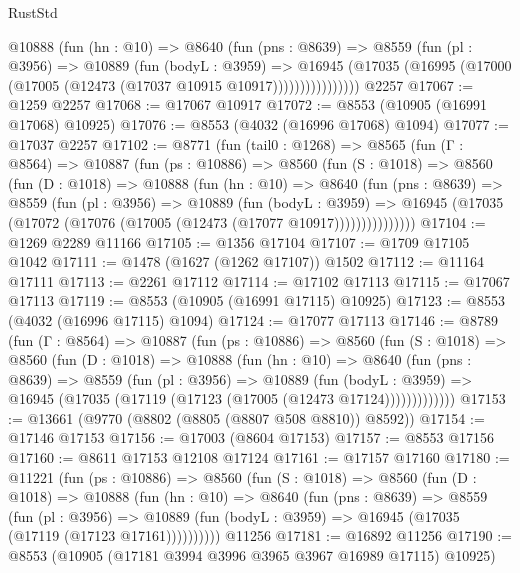 \begin{lexlean}{RustStd}
\begin{coremodule}
              @10888
                (fun (hn : @10) =>
                @8640
                  (fun (pns : @8639) =>
                  @8559
                    (fun (pl : @3956) =>
                    @10889
                      (fun (bodyL : @3959) =>
                      @16945
                        (@17035
                          (@16995 (@17000 (@17005 (@12473 (@17037 @10915 @10917))))))))))))))))
    @2257
@17067 := @1259 @2257
@17068 := @17067 @10917
@17072 := @8553 (@10905 (@16991 @17068) @10925)
@17076 := @8553 (@4032 (@16996 @17068) @1094)
@17077 := @17037 @2257
@17102 := @8771
    (fun (tail0 : @1268) =>
    @8565
      (fun (Γ : @8564) =>
      @10887
        (fun (ps : @10886) =>
        @8560
          (fun (S : @1018) =>
          @8560
            (fun (D : @1018) =>
            @10888
              (fun (hn : @10) =>
              @8640
                (fun (pns : @8639) =>
                @8559
                  (fun (pl : @3956) =>
                  @10889
                    (fun (bodyL : @3959) =>
                    @16945 (@17035 (@17072 (@17076 (@17005 (@12473 (@17077 @10917)))))))))))))))
@17104 := @1269 @2289 @11166
@17105 := @1356 @17104
@17107 := @1709 @17105 @1042
@17111 := @1478 (@1627 (@1262 @17107)) @1502
@17112 := @11164 @17111
@17113 := @2261 @17112
@17114 := @17102 @17113
@17115 := @17067 @17113
@17119 := @8553 (@10905 (@16991 @17115) @10925)
@17123 := @8553 (@4032 (@16996 @17115) @1094)
@17124 := @17077 @17113
@17146 := @8789
    (fun (Γ : @8564) =>
    @10887
      (fun (ps : @10886) =>
      @8560
        (fun (S : @1018) =>
        @8560
          (fun (D : @1018) =>
          @10888
            (fun (hn : @10) =>
            @8640
              (fun (pns : @8639) =>
              @8559
                (fun (pl : @3956) =>
                @10889
                  (fun (bodyL : @3959) =>
                  @16945 (@17035 (@17119 (@17123 (@17005 (@12473 @17124)))))))))))))
@17153 := @13661 (@9770 (@8802 (@8805 (@8807 @508 @8810)) @8592))
@17154 := @17146 @17153
@17156 := @17003 (@8604 @17153)
@17157 := @8553 @17156
@17160 := @8611 @17153 @12108 @17124
@17161 := @17157 @17160
@17180 := @11221
    (fun (ps : @10886) =>
    @8560
      (fun (S : @1018) =>
      @8560
        (fun (D : @1018) =>
        @10888
          (fun (hn : @10) =>
          @8640
            (fun (pns : @8639) =>
            @8559
              (fun (pl : @3956) =>
              @10889 (fun (bodyL : @3959) => @16945 (@17035 (@17119 (@17123 @17161))))))))))
    @11256
@17181 := @16892 @11256
@17190 := @8553 (@10905 (@17181 @3994 @3996 @3965 @3967 @16989 @17115) @10925)

\end{coremodule}
\end{lexlean}
